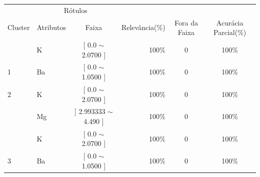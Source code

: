 \begin{table}[!h]
{\begin{tabular}{llcrcc}
\multicolumn{1}{c}{\cellcolor[HTML]{FFFFFF}} & \multicolumn{2}{c}{Rótulos}                & \multicolumn{1}{r}{}               & \\ \cline{2-3}
Cluster                                      & Atributos      & \multicolumn{1}{c}{Faixa} & \multicolumn{1}{c}{Relevância(\%)} & Fora da Faixa & Acurácia Parcial(\%)\\ \hline \hline
                                             & K     & [ 0.0 $\sim$  2.0700      ]       & 100\%                               & 0 & 100\% \\  
\multirow{-2}{*}{1}                          & Ba    & [ 0.0 $\sim$  1.0500     ]       & 100\%                               & 0 & 100\% \\  \hline
2                                            & K     & [ 0.0 $\sim$  2.0700 ]           & 100\%                               & 0 & 100\% \\  \hline
                                            & Mg     & ]  2.993333 $\sim$  4.490  ]              & 100\%                               & 0 & 100\% \\ 
                                            & K     & [ 0.0 $\sim$  2.0700 ]               & 100\%                               & 0 & 100\% \\  
\multirow{-3}{*}{3}                          & Ba    & [ 0.0 $\sim$  1.0500     ]      & 100\%                               & 0 &  100\% \\  \hline

\end{tabular}}
\end{table}
